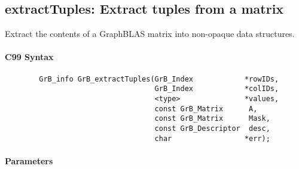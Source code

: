 
\subsection{{\sf extractTuples}: Extract tuples from a matrix}
\label{Sec:extractTuples}

Extract the contents of a GraphBLAS matrix into non-opaque data structures.

\paragraph{C99 Syntax}

\begin{verbatim}
        GrB_info GrB_extractTuples(GrB_Index            *rowIDs,
                                   GrB_Index            *colIDs,
                                   <type>               *values, 
                                   const GrB_Matrix      A,
                                   const GrB_Matrix      Mask,
                                   const GrB_Descriptor  desc,
                                   char                 *err);
\end{verbatim}

\paragraph{Parameters}

